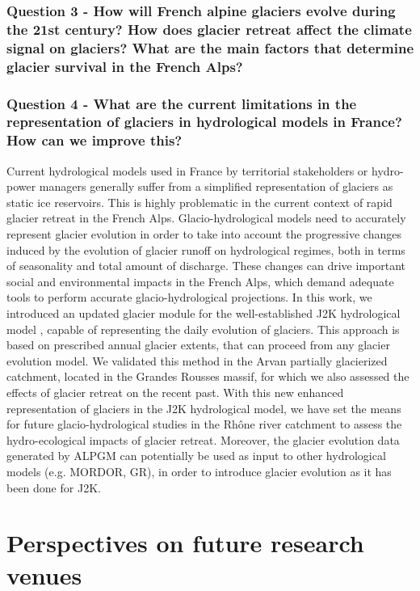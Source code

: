 \subsubsection{Question 3 - How will French alpine glaciers evolve during the 21st century? How does glacier retreat affect the climate signal on glaciers? What are the main factors that determine glacier survival in the French Alps?}

\blindtext

\subsubsection{Question 4 - What are the current limitations in the representation of glaciers in hydrological models in France? How can we improve this?}

Current hydrological models used in France by territorial stakeholders or hydro-power managers generally suffer from a simplified representation of glaciers as static ice reservoirs. This is highly problematic in the current context of rapid glacier retreat in the French Alps. Glacio-hydrological models need to accurately represent glacier evolution in order to take into account the progressive changes induced by the evolution of glacier runoff on hydrological regimes, both in terms of seasonality and total amount of discharge. These changes can drive important social and environmental impacts in the French Alps, which demand adequate tools to perform accurate glacio-hydrological projections. In this work, we introduced an updated glacier module for the well-established J2K hydrological model \citep{krause_quantifying_2002}, capable of representing the daily evolution of glaciers. This approach is based on prescribed annual glacier extents, that can proceed from any glacier evolution model. We validated this method in the Arvan partially glacierized catchment, located in the Grandes Rousses massif, for which we also assessed the effects of glacier retreat on the recent past. With this new enhanced representation of glaciers in the J2K hydrological model, we have set the means for future glacio-hydrological studies in the Rhône river catchment to assess the hydro-ecological impacts of glacier retreat.  Moreover, the glacier evolution data generated by ALPGM can potentially be used as input to other hydrological models (e.g. MORDOR, GR), in order to introduce glacier evolution as it has been done for J2K.

\section{Perspectives on future research venues}

